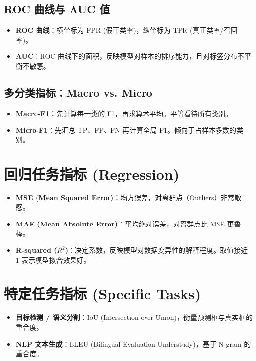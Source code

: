 \documentclass[12pt, a4paper]{article}
\begin{document}
\subsection{ROC 曲线与 AUC 值}
\begin{itemize}
    \item \textbf{ROC 曲线}：横坐标为 FPR (假正类率)，纵坐标为 TPR (真正类率/召回率)。
    \item \textbf{AUC}：ROC 曲线下的面积，反映模型对样本的排序能力，且对标签分布不平衡不敏感。
\end{itemize}

\subsection{多分类指标：Macro vs. Micro}
\begin{itemize}
    \item \textbf{Macro-F1}：先计算每一类的 F1，再求算术平均。平等看待所有类别。
    \item \textbf{Micro-F1}：先汇总 TP、FP、FN 再计算全局 F1。倾向于占样本多数的类别。
\end{itemize}

\section{回归任务指标 (Regression)}

\begin{itemize}
    \item \textbf{MSE (Mean Squared Error)}：均方误差，对离群点（Outliers）非常敏感。
    \item \textbf{MAE (Mean Absolute Error)}：平均绝对误差，对离群点比 MSE 更鲁棒。
    \item \textbf{R-squared ($R^2$)}：决定系数，反映模型对数据变异性的解释程度。取值接近 1 表示模型拟合效果好。
\end{itemize}

\section{特定任务指标 (Specific Tasks)}

\begin{itemize}
    \item \textbf{目标检测 / 语义分割}：IoU (Intersection over Union)，衡量预测框与真实框的重合度。
    \item \textbf{NLP 文本生成}：BLEU (Bilingual Evaluation Understudy)，基于 N-gram 的重合度。
\end{itemize}
\end{document}
